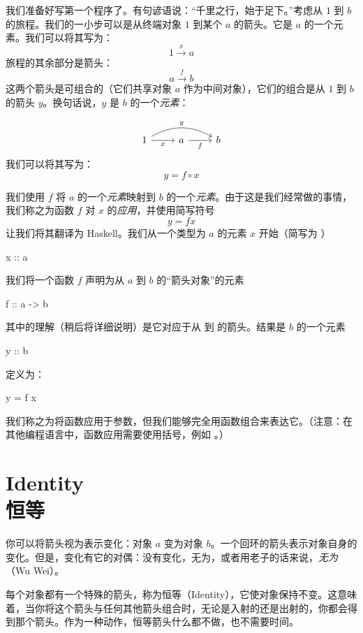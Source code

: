\documentclass[DaoFP]{subfiles}
\begin{document}
    我们准备好写第一个程序了。有句谚语说：“千里之行，始于足下。”考虑从 $1$ 到 $b$ 的旅程。我们的一小步可以是从终端对象 $1$ 到某个 $a$ 的箭头。它是 $a$ 的一个元素。我们可以将其写为：
    \[1 \xrightarrow x a \]
    旅程的其余部分是箭头：
    \[a \xrightarrow f b\]
    这两个箭头是可组合的（它们共享对象 $a$ 作为中间对象），它们的组合是从 $1$ 到 $b$ 的箭头 $y$。换句话说，$y$ 是 $b$ 的一个\emph{元素}：

    \[
        \begin{tikzcd}
            1
            \arrow[rr, bend left, "y"]
            \arrow[r, "x"']
            & a
            \arrow[r, "f"']
            & b
        \end{tikzcd}
    \]
    我们可以将其写为：
    \[y = f \circ x \]

    我们使用 $f$ 将 $a$ 的一个\emph{元素}映射到 $b$ 的一个\emph{元素}。由于这是我们经常做的事情，我们称之为函数 $f$ 对 $x$ 的\emph{应用}，并使用简写符号
    \[y = f x \]
    让我们将其翻译为 Haskell。我们从一个类型为 $a$ 的元素 $x$ 开始（简写为 ）
    \begin{haskell}
        x :: a
    \end{haskell}
    我们将一个函数 $f$ 声明为从 $a$ 到 $b$ 的“箭头对象”的元素
    \begin{haskell}
        f :: a -> b
    \end{haskell}
    其中的理解（稍后将详细说明）是它对应于从  到  的箭头。结果是 $b$ 的一个元素
    \begin{haskell}
        y :: b
    \end{haskell}
    定义为：
    \begin{haskell}
        y = f x
    \end{haskell}
    我们称之为将函数应用于参数，但我们能够完全用函数组合来表达它。（注意：在其他编程语言中，函数应用需要使用括号，例如 。）

    \section{Identity\\恒等}

    你可以将箭头视为表示变化：对象 $a$ 变为对象 $b$。一个回环的箭头表示对象自身的变化。但是，变化有它的对偶：没有变化，无为，或者用老子的话来说，\emph{无为}（Wu Wei）。

    每个对象都有一个特殊的箭头，称为恒等（Identity），它使对象保持不变。这意味着，当你将这个箭头与任何其他箭头组合时，无论是入射的还是出射的，你都会得到那个箭头。作为一种动作，恒等箭头什么都不做，也不需要时间。
\end{document}
